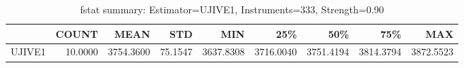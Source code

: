 \begin{table}[ht]
\centering
\caption{fstat summary: Estimator=UJIVE1, Instruments=333, Strength=0.90}
\begin{tabular}{lrrrrrrrr}
\toprule
 & COUNT & MEAN & STD & MIN & 25\% & 50\% & 75\% & MAX \\
\midrule
UJIVE1 & 10.0000 & 3754.3600 & 75.1547 & 3637.8308 & 3716.0040 & 3751.4194 & 3814.3794 & 3872.5523 \\
\bottomrule
\end{tabular}
\end{table}
